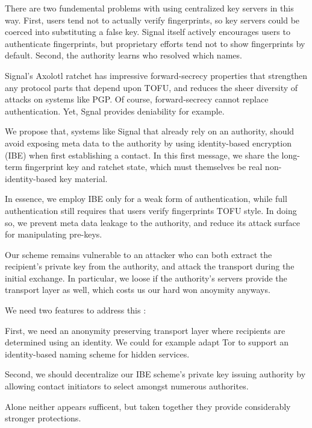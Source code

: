 \documentclass[twoside,letterpaper]{sig-alternate}
\begin{document}
There are two fundemental problems with using centralized key servers
in this way.  
First, users tend not to actually verify fingerprints, so 
key servers could be coerced into substituting a false key.
Signal itself actively encourages users to authenticate fingerprints,
but proprietary efforts tend not to show fingerprints by default.
Second, the authority learns who resolved which names.

Signal's Axolotl ratchet has impressive forward-secrecy properties
that strengthen any protocol parts that depend upon TOFU, and
reduces the sheer diversity of attacks on systems like PGP.
Of course, forward-secrecy cannot replace authentication.
Yet, Sgnal provides deniability for example.

\smallskip

We propose that, systems like Signal that already rely on an authority,
should avoid exposing meta data to the authority by using
identity-based encryption (IBE) when first establishing a contact.
In this first message, we share the long-term fingerprint key and
ratchet state, which must themselves be real non-identity-based key
material. 

In essence, we employ IBE only for a weak form of authentication, 
while full authentication still requires that users verify fingerprints
TOFU style.
In doing so, we prevent meta data leakage to the authority, and reduce
its attack surface for manipulating pre-keys.  

Our scheme remains vulnerable to an attacker who can both
 extract the recipient's private key from the authority, and
 attack the transport during the initial exchange.  
In particular, we loose if the authority's servers provide the transport
layer as well, which costs us our hard won anoymity anyways. 

We need two features to address this :

First, we need an anonymity preserving transport layer where recipients
are determined using an identity.  We could for example adapt Tor to
support an identity-based naming scheme for hidden services.  

Second, we should decentralize our IBE scheme's private key issuing
authority by allowing contact initiators to select amongst numerous
authorites.

Alone neither appears sufficent, but taken together they provide 
considerably stronger protections. 
\end{document}
